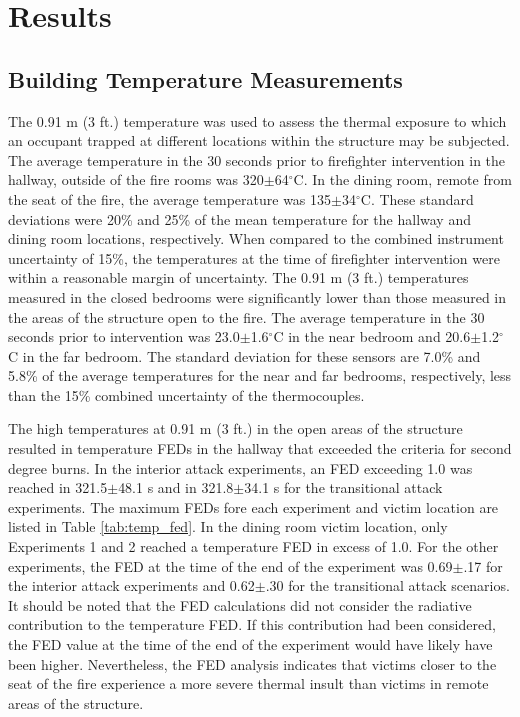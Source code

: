 \documentclass[12pt,oneside]{article}
\begin{document}
\section{Results}

\subsection{Building Temperature Measurements}
\label{subsec:temps}
The 0.91 m (3 ft.) temperature was used to assess the thermal exposure to which an occupant trapped at different locations within the structure may be subjected. The average temperature in the 30 seconds prior to firefighter intervention in the hallway, outside of the fire rooms was 320$\pm$64$^{\circ}$C. In the dining room, remote from the seat of the fire, the average temperature was 135$\pm$34$^{\circ}$C. These standard deviations were 20\% and 25\% of the mean temperature for the hallway and dining room locations, respectively. When compared to the combined instrument uncertainty of 15\%, the temperatures at the time of firefighter intervention were within a reasonable margin of uncertainty. The 0.91 m (3 ft.) temperatures measured in the closed bedrooms were significantly lower than those measured in the areas of the structure open to the fire. The average temperature in the 30 seconds prior to intervention was 23.0$\pm$1.6$^{\circ}$C in the near bedroom and 20.6$\pm$1.2$^{\circ}$C in the far bedroom. The standard deviation for these sensors are 7.0\% and 5.8\% of the average temperatures for the near and far bedrooms, respectively, less than the 15\% combined uncertainty of the thermocouples.


The high temperatures at 0.91 m (3 ft.) in the open areas of the structure resulted in temperature FEDs in the hallway that exceeded the criteria for second degree burns. In the interior attack experiments, an FED exceeding 1.0 was reached in 321.5$\pm$48.1 s and in 321.8$\pm$34.1 s for the transitional attack experiments.  The maximum FEDs fore each experiment and victim location are listed in Table \ref{tab:temp_fed}. In the dining room victim location, only Experiments 1 and 2 reached a temperature FED in excess of 1.0. For the other experiments, the FED at the time of the end of the experiment was 0.69$\pm$.17 for the interior attack experiments and 0.62$\pm$.30 for the transitional attack scenarios. It should be noted that the FED calculations did not consider the radiative contribution to the temperature FED. If this contribution had been considered, the FED value at the time of the end of the experiment would have likely have been higher. Nevertheless, the FED analysis indicates that victims closer to the seat of the fire experience a more severe thermal insult than victims in remote areas of the structure.
\end{document}
